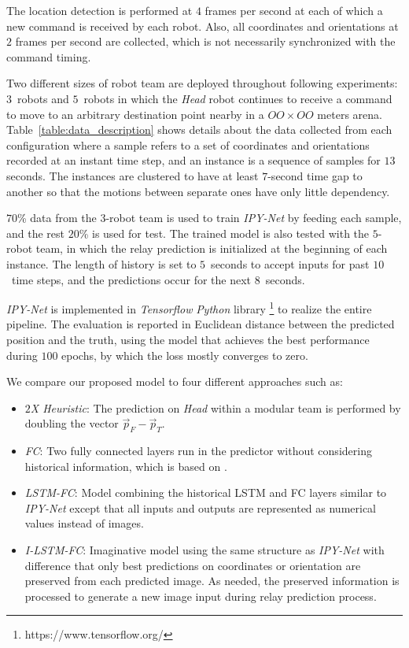 \documentclass[letterpaper, 10 pt, conference]{ieeeconf}  %
\begin{document}
	The location detection is performed at $4$ frames per second at each of which 
	a new command is received by each robot. Also, 
	all coordinates and orientations at $2$ frames per second are collected, which 
	is not necessarily synchronized with the command timing. 
	
	Two different sizes of robot team are deployed throughout following experiments: 
	$3$~robots and $5$~robots in which the \emph{Head} robot continues to receive a command to 
	move to an arbitrary destination point nearby in a $OO \times OO$ meters arena. 
	Table~\ref{table:data_description} shows details about the data collected from 
	each configuration where a sample refers to a set of coordinates and orientations recorded 
	at an instant time step, and an instance is a sequence of samples for $13$ seconds. 
	The instances are clustered to have at least $7$-second time gap to another so that
	the motions between separate ones have only little dependency. 
	
	$70$\% data from the $3$-robot team is used to train \emph{IPY-Net} by feeding each sample, 
	and the rest $20$\% is used for test. 
	The trained model is also tested with the $5$-robot team, in which the relay prediction is 
	initialized at the beginning of each instance. 
	The length of history is set to $5$~seconds to accept inputs for past $10$~time steps, and 
	the predictions occur for the next $8$~seconds.  
	 	
	\emph{IPY-Net} is implemented in \emph{Tensorflow} \emph{Python} library \footnote{https://www.tensorflow.org/} 
	to realize the entire pipeline. The evaluation is reported in Euclidean distance between 
	the predicted position and the truth, using the model that achieves the best performance 
	during $100$ epochs, by which the loss mostly converges to zero. 

	We compare our proposed model to four different approaches such as: 
	\begin{itemize}
		\item \emph{$2$X Heuristic}: 
		The prediction on \emph{Head} within a modular team is performed by doubling the vector 
		$\vec{p}_{F} - \vec{p}_{T}$.
		
		\item \emph{FC}: 
		Two fully connected layers run in the predictor without considering historical 
		information, which is based on \cite{CPR17}.  
				
		\item \emph{LSTM-FC}: 
		Model combining the historical LSTM and FC layers similar to \emph{IPY-Net} except that 
		all inputs and outputs are represented as numerical values instead of images. 
		
		\item \emph{I-LSTM-FC}: 
		Imaginative model using the same structure as \emph{IPY-Net} with difference that 
		only best predictions on coordinates or orientation are preserved from each predicted image. 
		As needed, the preserved information is processed to generate a new image input during 
		relay prediction process.
	\end{itemize}	
\end{document}
